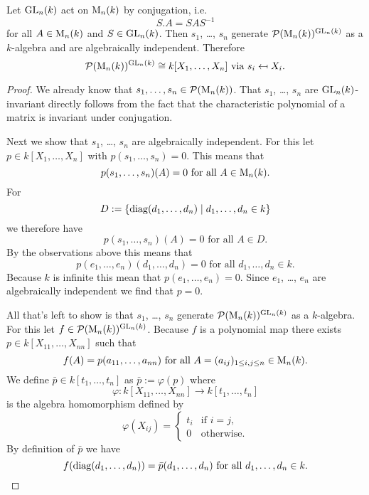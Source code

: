 \begin{thrm}
 Let $\operatorname{GL}_n(k)$ act on $\operatorname{M}_n(k)$ by conjugation, i.e.
 \[
  S.A = SAS^{-1}
 \]
 for all $A \in \operatorname{M}_n(k)$ and $S \in \operatorname{GL}_n(k)$. Then $s_1$, \dots, $s_n$ generate $\mathcal{P}(\operatorname{M}_n(k))^{\operatorname{GL}_n(k)}$ as a $k$-algebra and are algebraically independent. Therefore
 \[
  \mathcal{P}(\operatorname{M}_n(k))^{\operatorname{GL}_n(k)} \cong k[X_1, \dotsc, X_n] \text{ via } s_i \mapsfrom X_i.
 \]
\end{thrm}
\begin{proof}
 We already know that $s_1, \dotsc, s_n \in \mathcal{P}(\operatorname{M}_n(k))$. That $s_1$, \dots, $s_n$ are $\operatorname{GL}_n(k)$-invariant directly follows from the fact that the characteristic polynomial of a matrix is invariant under conjugation.
 
 Next we show that $s_1$, \dots, $s_n$ are algebraically independent. For this let $p \in k[X_1, \dotsc, X_n]$ with $p(s_1, \dotsc, s_n) = 0$. This means that
 \[
  p(s_1, \dotsc, s_n)(A) = 0 \text{ for all } A \in \operatorname{M}_n(k).
 \]
 For
 \[
  D := \{\operatorname{diag}(d_1, \dotsc, d_n) \mid d_1, \dotsc, d_n \in k\}
 \]
 we therefore have
 \[
  p(s_1, \dotsc, s_n)(A) = 0 \text{ for all } A \in D.
 \]
 By the observations above this means that 
 \[
  p(e_1, \dotsc, e_n)(d_1, \dotsc, d_n) = 0 \text{ for all } d_1, \dotsc, d_n \in k.
 \]
 Because $k$ is infinite this mean that $p(e_1, \dotsc, e_n) = 0$. Since $e_1$, \dots, $e_n$ are algebraically independent we find that $p =0$.
 
 All that’s left to show is that $s_1$, \dots, $s_n$ generate $\mathcal{P}(\operatorname{M}_n(k))^{\operatorname{GL}_n(k)}$ as a $k$-algebra. For this let $f \in \mathcal{P}(\operatorname{M}_n(k))^{\operatorname{GL}_n(k)}$. Because $f$ is a polynomial map there exists $p \in k[X_{11}, \dotsc, X_{nn}]$ such that
 \[
  f(A) = p(a_{11}, \dotsc, a_{nn}) \text{ for all } A = (a_{ij})_{1 \leq i,j \leq n} \in \operatorname{M}_n(k).
 \]
 We define $\bar{p} \in k[t_1, \dotsc, t_n]$ as $\bar{p} := \varphi(p)$ where
 \[
  \varphi \colon k[X_{11}, \dotsc, X_{nn}] \to k[t_1, \dotsc, t_n]
 \]
 is the algebra homomorphism defined by
 \[
  \varphi(X_{ij}) =
  \begin{cases}
   t_i & \text{if } i = j, \\
     0 & \text{otherwise}.
  \end{cases}
 \]
 By definition of $\bar{p}$ we have
 \[
  f(\operatorname{diag}(d_1, \dotsc, d_n)) = \bar{p}(d_1, \dotsc, d_n) \text{ for all } d_1, \dotsc, d_n \in k.
 \]
 

\end{proof}
